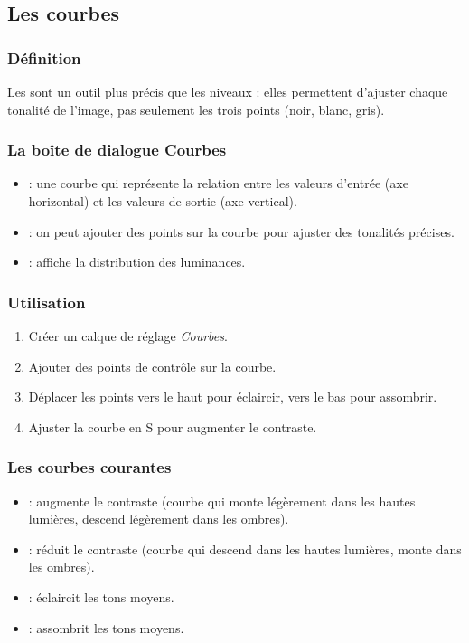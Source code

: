 \subsection{Les courbes}

\subsubsection{Définition}

Les  sont un outil plus précis que les niveaux : elles permettent d'ajuster chaque tonalité de l'image, pas seulement les trois points (noir, blanc, gris).

\subsubsection{La boîte de dialogue Courbes}

\begin{itemize}
    \item {} : une courbe qui représente la relation entre les valeurs d'entrée (axe horizontal) et les valeurs de sortie (axe vertical).
    \item {} : on peut ajouter des points sur la courbe pour ajuster des tonalités précises.
    \item {} : affiche la distribution des luminances.
\end{itemize}

\subsubsection{Utilisation}

\begin{enumerate}
    \item Créer un calque de réglage \emph{Courbes}.
    \item Ajouter des points de contrôle sur la courbe.
    \item Déplacer les points vers le haut pour éclaircir, vers le bas pour assombrir.
    \item Ajuster la courbe en S pour augmenter le contraste.
\end{enumerate}

\subsubsection{Les courbes courantes}

\begin{itemize}
    \item {} : augmente le contraste (courbe qui monte légèrement dans les hautes lumières, descend légèrement dans les ombres).
    \item {} : réduit le contraste (courbe qui descend dans les hautes lumières, monte dans les ombres).
    \item {} : éclaircit les tons moyens.
    \item {} : assombrit les tons moyens.
\end{itemize}

